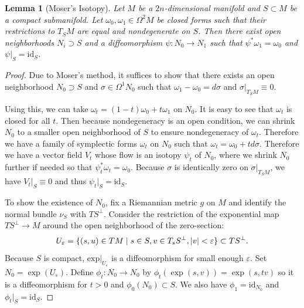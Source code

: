 \documentclass[leqno, openany]{memoir}
\newtheorem{lem}[thm]{Lemma}
\theoremstyle{definition}
\theoremstyle{remark}
\theoremstyle{plain}
\theoremstyle{definition}
\theoremstyle{remark}
\newcommand{\ep}{\varepsilon}
\newcommand{\mr}[1]{\mathrm{#1}}
\begin{document}
\begin{lem}[Moser's Isotopy]
    Let $M$ be a $2n$-dimensional manifold and $S \subset M$ be a compact submanifold. Let $\omega_0, \omega_1 \in \Omega^2 M$ be closed forms such that their restrictions to $T_S M$ are equal and nondegenerate on $S$. Then there exist open neighborhoods $N_i \supset S$ and a diffeomorphism $\psi: N_0 \to N_1$ such that $\psi^* \omega_1 = \omega_0$ and $\psi |_S = \mr{id}_S$.
\end{lem}
\begin{proof}
    Due to Moser's method, it suffices to show that there exists an open neighborhood $N_0 \supset S$ and $\sigma \in \Omega^1 N_0$ such that $\omega_1 - \omega_0 = d \sigma$ and $\sigma |_{T_SM} \equiv 0$.

    Using this, we can take $\omega_t = (1 - t) \omega_0 + t \omega_1$ on $N_0$. It is easy to see that $\omega_t$ is closed for all $t$. Then because nondegeneracy is an open condition, we can shrink $N_0$ to a smaller open neighborhood of $S$ to ensure nondegeneracy of $\omega_t$. Therefore we have a family of symplectic forms $\omega_t$ on $N_0$ such that $\omega_t = \omega_0 + t d \sigma$. Therefore we have a vector field $V_t$ whose flow is an isotopy $\psi_t$ of $N_0$, where we shrink $N_0$ further if needed so that $\psi_t^* \omega_t = \omega_0$. Because $\sigma$ is identically zero on $\sigma |_{T_SM}$, we have $V_t |_S \equiv 0$ and thus $\psi_t|_S = \mr{id}_S$.

    To show the existence of $N_0$, fix a Riemannian metric $g$ on $M$ and identify the normal bundle $\nu_S$ with $TS^{\perp}$. Consider the restriction of the exponential map $TS^{\perp} \to M$ around the open neighborhood of the zero-section:
    \[ U_{\ep} = \{ (s,u) \in TM \mid s \in S, v \in T_s S^{\perp}, \abs{v} < \ep \} \subset TS^{\perp}. \]
    Because $S$ is compact, $\mr{exp} |_{U_{\ep}}$ is a diffeomorphism for small enough $\ep$. Set $N_0 = \exp(U_{\ep})$. Define $\phi_t:N_0 \to N_0$ by $\phi_t(\exp(s,v)) = \exp(s, tv)$ so it is a diffeomorphism for $t > 0$ and $\phi_0(N_0) \subset S$. We also have $\phi_1 = \mr{id}_{N_0}$ and $\phi_t |_S = \mr{id}_S$.


\end{proof}
\end{document}
